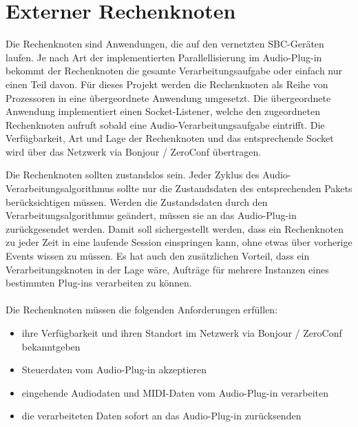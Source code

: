 \section{Externer Rechenknoten}

Die Rechenknoten sind Anwendungen, die auf den vernetzten SBC-Geräten laufen. Je nach Art der implementierten Parallellisierung im Audio-Plug-in bekommt der Rechenknoten die gesamte Verarbeitungsaufgabe oder einfach nur einen Teil davon.  Für dieses Projekt werden die Rechenknoten als Reihe von Prozessoren in eine übergeordnete Anwendung umgesetzt. Die übergeordnete Anwendung implementiert einen Socket-Listener, welche den zugeordneten Rechenknoten aufruft sobald eine Audio-Verarbeitungsaufgabe eintrifft. Die Verfügbarkeit, Art und Lage der Rechenknoten und das entsprechende Socket wird über das Netzwerk via Bonjour / ZeroConf übertragen.

Die Rechenknoten sollten zustandslos sein. Jeder Zyklus des Audio-Verarbeitungsalgorithmus sollte nur die Zustandsdaten des entsprechenden Pakets berücksichtigen müssen. Werden die Zustandsdaten durch den Verarbeitungsalgorithmus geändert, müssen sie an das Audio-Plug-in zurückgesendet werden. Damit soll sichergestellt werden, dass ein Rechenknoten zu jeder Zeit in eine laufende Session einspringen kann, ohne etwas über vorherige Events wissen zu müssen. Es hat auch den zusätzlichen Vorteil, dass ein Verarbeitungsknoten in der Lage wäre, Aufträge für mehrere Instanzen eines bestimmten Plug-ins verarbeiten zu können.\\
\\
\noindent
Die Rechenknoten müssen die folgenden Anforderungen erfüllen:

\begin{itemize}

\item ihre Verfügbarkeit und ihren Standort im Netzwerk via Bonjour / ZeroConf bekanntgeben
\item Steuerdaten vom Audio-Plug-in akzeptieren
\item eingehende Audiodaten und MIDI-Daten vom Audio-Plug-in verarbeiten
\item die verarbeiteten Daten sofort an das Audio-Plug-in zurücksenden

\end{itemize}